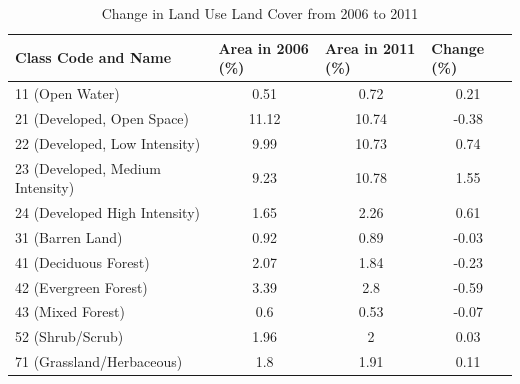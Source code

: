 \documentclass[letterpaper,12pt]{article}
\begin{document}
\begin{enumerate}
\begin{table}[]
	\centering
	\caption{Change in Land Use Land Cover from 2006 to 2011}
	\label{my-label}
	\begin{tabular}{|l|c|c|c|}
		\hline
		Class Code and Name               & \multicolumn{1}{l|}{Area in 2006 (\%)} & \multicolumn{1}{l|}{Area in 2011 (\%)} & \multicolumn{1}{l|}{Change (\%)} \\ \hline
		11 (Open Water)                   & 0.51                                   & 0.72                                   & 0.21                             \\ \hline
		21 (Developed, Open Space)        & 11.12                                  & 10.74                                  & -0.38                            \\ \hline
		22 (Developed, Low Intensity)     & 9.99                                   & 10.73                                  & 0.74                             \\ \hline
		23 (Developed, Medium Intensity)  & 9.23                                   & 10.78                                  & 1.55                             \\ \hline
		24 (Developed High Intensity)     & 1.65                                   & 2.26                                   & 0.61                             \\ \hline
		31 (Barren Land)                  & 0.92                                   & 0.89                                   & -0.03                            \\ \hline
		41 (Deciduous Forest)             & 2.07                                   & 1.84                                   & -0.23                            \\ \hline
		42 (Evergreen Forest)             & 3.39                                   & 2.8                                    & -0.59                            \\ \hline
		43 (Mixed Forest)                 & 0.6                                    & 0.53                                   & -0.07                            \\ \hline
		52 (Shrub/Scrub)                  & 1.96                                   & 2                                      & 0.03                             \\ \hline
		71 (Grassland/Herbaceous)         & 1.8                                    & 1.91                                   & 0.11                             \\ \hline

\end{tabular}
\end{table}
\end{enumerate}
\end{document}
